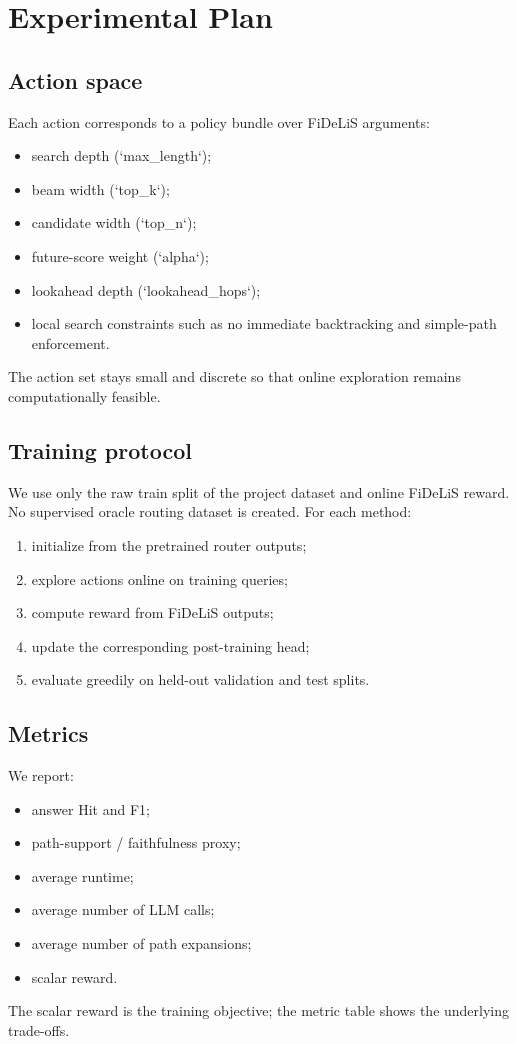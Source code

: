 \documentclass[11pt]{article}
\begin{document}
\section{Experimental Plan}
\subsection{Action space}
Each action corresponds to a policy bundle over FiDeLiS arguments:
\begin{itemize}[leftmargin=1.5em]
\item search depth (`max\_length`);
\item beam width (`top\_k`);
\item candidate width (`top\_n`);
\item future-score weight (`alpha`);
\item lookahead depth (`lookahead\_hops`);
\item local search constraints such as no immediate backtracking and simple-path enforcement.
\end{itemize}
The action set stays small and discrete so that online exploration remains computationally feasible.

\subsection{Training protocol}
We use only the raw train split of the project dataset and online FiDeLiS reward. No supervised oracle routing dataset is created. For each method:
\begin{enumerate}[leftmargin=1.5em]
\item initialize from the pretrained router outputs;
\item explore actions online on training queries;
\item compute reward from FiDeLiS outputs;
\item update the corresponding post-training head;
\item evaluate greedily on held-out validation and test splits.
\end{enumerate}

\subsection{Metrics}
We report:
\begin{itemize}[leftmargin=1.5em]
\item answer Hit and F1;
\item path-support / faithfulness proxy;
\item average runtime;
\item average number of LLM calls;
\item average number of path expansions;
\item scalar reward.
\end{itemize}
The scalar reward is the training objective; the metric table shows the underlying trade-offs.
\end{document}

